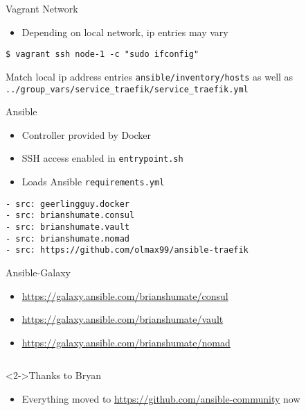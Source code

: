 \documentclass[presentation]{beamer}
\begin{document}
\begin{frame}[label={sec:orge44b35f},fragile]{Vagrant Network}
 \begin{itemize}
\item Depending on local network, ip entries may vary
\end{itemize}
\begin{verbatim}
$ vagrant ssh node-1 -c "sudo ifconfig"
\end{verbatim}

\begin{block}{Match local ip address entries}
\texttt{ansible/inventory/hosts} 
as well as 
\texttt{../group\_vars/service\_traefik/service\_traefik.yml}
\end{block}
\end{frame}

\begin{frame}[label={sec:orge3bee89},fragile]{Ansible}
 \begin{itemize}
\item Controller provided by Docker
\item SSH access enabled in \texttt{entrypoint.sh}
\item Loads Ansible \texttt{requirements.yml}
\end{itemize}
\begin{verbatim}
- src: geerlingguy.docker
- src: brianshumate.consul
- src: brianshumate.vault
- src: brianshumate.nomad
- src: https://github.com/olmax99/ansible-traefik
\end{verbatim}
\end{frame}

\begin{frame}[label={sec:org9c76e81}]{Ansible-Galaxy}
\begin{itemize}
\item \href{https://galaxy.ansible.com/brianshumate/consul}{https://galaxy.ansible.com/brianshumate/consul}
\item \href{https://galaxy.ansible.com/brianshumate/vault}{https://galaxy.ansible.com/brianshumate/vault}
\item \href{https://galaxy.ansible.com/brianshumate/nomad}{https://galaxy.ansible.com/brianshumate/nomad}
\end{itemize}

\begin{columns}
\begin{column}{0.48\columnwidth}
\begin{block}<2->{Thanks to Bryan}
\begin{itemize}
\item Everything moved to \href{https://github.com/ansible-community}{https://github.com/ansible-community} now
\end{itemize}
\end{block}
\end{column}
\end{columns}
\end{frame}
\end{document}
